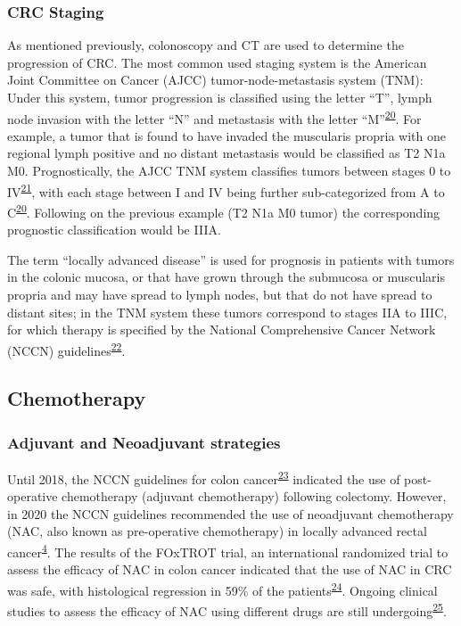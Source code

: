\documentclass[11pt]{umnthesis}
\begin{document}
\hypertarget{crc-staging}{%
\subsubsection{CRC Staging}\label{crc-staging}}

As mentioned previously, colonoscopy and CT are used to determine the progression of CRC. The most common used staging system is the American Joint Committee on Cancer (AJCC) tumor-node-metastasis system (TNM): Under this system, tumor progression is classified using the letter ``T'', lymph node invasion with the letter ``N'' and metastasis with the letter ``M''\textsuperscript{\protect\hyperlink{ref-ajcc2017}{20}}. For example, a tumor that is found to have invaded the muscularis propria with one regional lymph positive and no distant metastasis would be classified as T2 N1a M0. Prognostically, the AJCC TNM system classifies tumors between stages 0 to IV\textsuperscript{\protect\hyperlink{ref-greene2002}{21}}, with each stage between I and IV being further sub-categorized from A to C\textsuperscript{\protect\hyperlink{ref-ajcc2017}{20}}. Following on the previous example (T2 N1a M0 tumor) the corresponding prognostic classification would be IIIA.

The term ``locally advanced disease'' is used for prognosis in patients with tumors in the colonic mucosa, or that have grown through the submucosa or muscularis propria and may have spread to lymph nodes, but that do not have spread to distant sites; in the TNM system these tumors correspond to stages IIA to IIIC, for which therapy is specified by the National Comprehensive Cancer Network (NCCN) guidelines\textsuperscript{\protect\hyperlink{ref-benson2011}{22}}.

\hypertarget{chemotherapy}{%
\subsection{Chemotherapy}\label{chemotherapy}}

\hypertarget{adjuvant-and-neoadjuvant-strategies}{%
\subsubsection{Adjuvant and Neoadjuvant strategies}\label{adjuvant-and-neoadjuvant-strategies}}

Until 2018, the NCCN guidelines for colon cancer\textsuperscript{\protect\hyperlink{ref-benson2018}{23}} indicated the use of post-operative chemotherapy (adjuvant chemotherapy) following colectomy. However, in 2020 the NCCN guidelines recommended the use of neoadjuvant chemotherapy (NAC, also known as pre-operative chemotherapy) in locally advanced rectal cancer\textsuperscript{\protect\hyperlink{ref-benson2020}{4}}. The results of the FOxTROT trial, an international randomized trial to assess the efficacy of NAC in colon cancer indicated that the use of NAC in CRC was safe, with histological regression in 59\% of the patients\textsuperscript{\protect\hyperlink{ref-seymour2019}{24}}. Ongoing clinical studies to assess the efficacy of NAC using different drugs are still undergoing\textsuperscript{\protect\hyperlink{ref-roth2020}{25}}.
\end{document}
